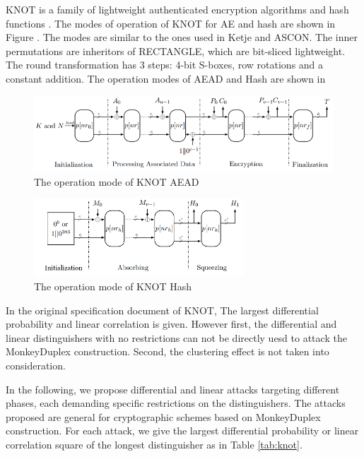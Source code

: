 KNOT is a family of lightweight authenticated encryption algorithms and hash functions \cite{ZDY19}. The modes of operation of KNOT for AE and hash are shown in Figure . The modes are similar to the ones used in Ketje and ASCON. The inner permutations are inheritors of RECTANGLE, which are bit-sliced lightweight. The round transformation has 3 steps: 4-bit S-boxes, row rotations and a constant addition. The operation modes of AEAD and Hash are shown in 

\begin{figure}
	\centering
	\includegraphics[width=1\textwidth]{fig/mode_aead.PNG}
	\caption{The operation mode of KNOT AEAD} \label{fig:mode_aead}
\end{figure}

\begin{figure}
	\centering
	\includegraphics[width=0.7\textwidth]{fig/mode_hash.PNG}
	\caption{The operation mode of KNOT Hash} \label{fig:mode_hash}
\end{figure}

In the original specification document of KNOT, The largest differential probability and linear correlation is given. However first, the differential and linear distinguishers with no restrictions can not be directly uesd to attack the MonkeyDuplex construction. Second, the clustering effect is not taken into consideration. 

In the following, we propose differential and linear attacks targeting different phases, each demanding specific restrictions on the distinguishers. The attacks proposed are general for cryptographic schemes based on MonkeyDuplex construction. For each attack, we give the largest differential probability or linear correlation square of the longest distinguisher as in Table \ref{tab:knot}. 

